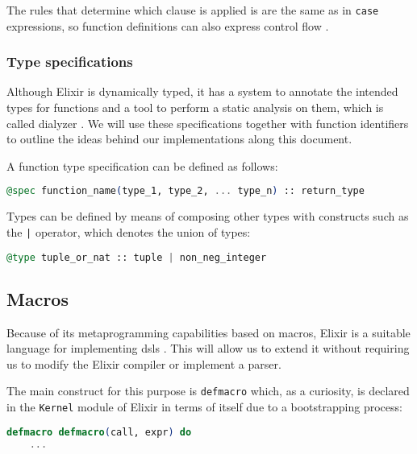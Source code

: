 The rules that determine which clause is applied is are the same as in
\verb|case| expressions, so function definitions can also express control flow
\citep{programmingElixir}.

\subsubsection{Type specifications}
\label{prelim:typespecs}

Although Elixir is dynamically typed, it has a system to annotate the intended
types for functions and a tool to perform a static analysis on them, which is 
called dialyzer \citep{Dialyzer}. We will use these specifications together with
function identifiers to outline the ideas behind our implementations along this
document.

A function type specification can be defined as follows: 

\begin{lstlisting}[language=elixir,numbers=none,frame=none]
@spec function_name(type_1, type_2, ... type_n) :: return_type
\end{lstlisting}

Types can be defined by means of composing other types with constructs such as
the \verb+|+ operator, which denotes the union of types:

\begin{lstlisting}[language=elixir,numbers=none,frame=none]
@type tuple_or_nat :: tuple | non_neg_integer
\end{lstlisting}

\subsection{Macros}

Because of its metaprogramming capabilities based on macros, Elixir is a
suitable language for implementing \gls{dsl}s \citep{metaprogrammingElixir}.
This will allow us to extend it without requiring us to modify the Elixir
compiler or implement a parser.

The main construct for this purpose is \verb|defmacro| which, as a curiosity, is
declared in the \verb|Kernel| module of Elixir in terms of itself due to a
bootstrapping process:

\begin{lstlisting}[language=elixir,numbers=none,frame=none]
  defmacro defmacro(call, expr) do
    ...
\end{lstlisting}

